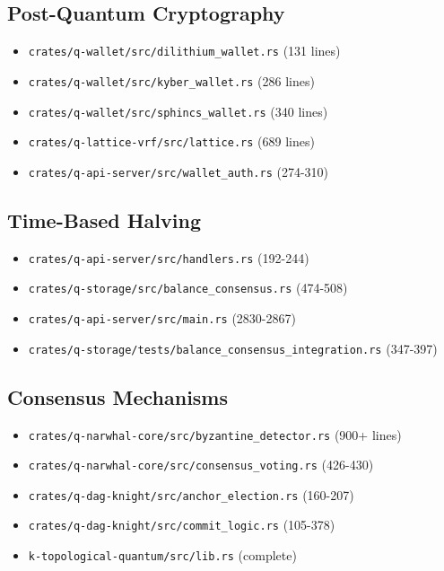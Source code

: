\documentclass[11pt,a4paper]{article}
\begin{document}
\subsection{Post-Quantum Cryptography}
\begin{itemize}
    \item \texttt{crates/q-wallet/src/dilithium\_wallet.rs} (131 lines)
    \item \texttt{crates/q-wallet/src/kyber\_wallet.rs} (286 lines)
    \item \texttt{crates/q-wallet/src/sphincs\_wallet.rs} (340 lines)
    \item \texttt{crates/q-lattice-vrf/src/lattice.rs} (689 lines)
    \item \texttt{crates/q-api-server/src/wallet\_auth.rs} (274-310)
\end{itemize}

\subsection{Time-Based Halving}
\begin{itemize}
    \item \texttt{crates/q-api-server/src/handlers.rs} (192-244)
    \item \texttt{crates/q-storage/src/balance\_consensus.rs} (474-508)
    \item \texttt{crates/q-api-server/src/main.rs} (2830-2867)
    \item \texttt{crates/q-storage/tests/balance\_consensus\_integration.rs} (347-397)
\end{itemize}

\subsection{Consensus Mechanisms}
\begin{itemize}
    \item \texttt{crates/q-narwhal-core/src/byzantine\_detector.rs} (900+ lines)
    \item \texttt{crates/q-narwhal-core/src/consensus\_voting.rs} (426-430)
    \item \texttt{crates/q-dag-knight/src/anchor\_election.rs} (160-207)
    \item \texttt{crates/q-dag-knight/src/commit\_logic.rs} (105-378)
    \item \texttt{k-topological-quantum/src/lib.rs} (complete)
\end{itemize}
\end{document}
